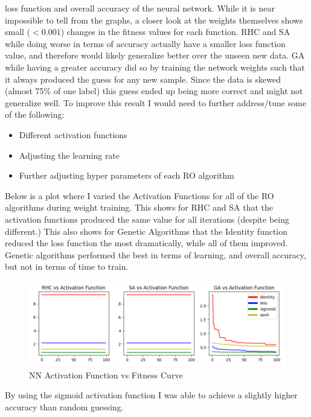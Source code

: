 \documentclass[11pt]{article}
\begin{document}
    loss function and overall accuracy of the neural network.
    While it is near impossible to tell from the graphs, a closer look at the weights themselves shows small ($< 0.001$)
    changes in the fitness values for each function.
    RHC and SA while doing worse in terms of accuracy actually have a smaller loss function value, and therefore would likely
    generalize better over the unseen new data.
    GA while having a greater accuracy did so by training the network weights such that it always produced the guess for
    any new sample.
    Since the data is skewed (almost 75\% of one label) this guess ended up being more correct and might not generalize well.
    To improve this result I would need to further address/tune some of the following:
    \begin{itemize}
        \item Different activation functions
        \item Adjusting the learning rate
        \item Further adjusting hyper parameters of each RO algorithm
    \end{itemize}
    Below is a plot where I varied the Activation Functions for all of the RO algorithms during weight training.
    This shows for RHC and SA that the activation functions produced the same value for all iterations (despite being different.)
    This also shows for Genetic Algorithms that the Identity function reduced the loss function the most dramatically, while
    all of them improved.
    Genetic algorithms performed the best in terms of learning, and overall accuracy, but not in terms of time to train.
    \begin{figure}
        \begin{center}
            \includegraphics[width=1\linewidth]{nnactfunc.png}
            \caption{NN Activation Function vs Fitness Curve}\label{Fig:NN Activation Function vs Fitness Curve}
        \end{center}
    \end{figure}
    By using the sigmoid activation function I was able to achieve a slightly higher accuracy than random guessing.
    \pagebreak
    
    
\end{document}
